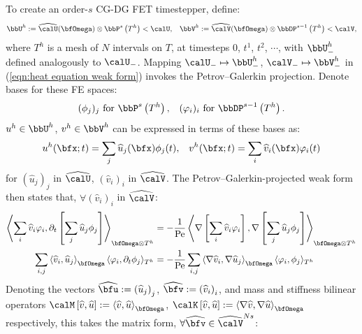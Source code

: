 \begin{example}
        To create an order-$s$ CG-DG FET timestepper, define:
        \begin{align}
            \bbU^{h}  :=  \widehat{\calU}(\bfOmega)\otimes\bbP^{s}\left(T^{h}\right)  <  \calU,  &&
            \bbV^{h}  :=  \widehat{\calV}(\bfOmega)\otimes\bbDP^{s - 1}\left(T^{h}\right)  <  \calV,
        \end{align}
        where $T^{h}$ is a mesh of $N$ intervals on $T$, at timesteps $0$, $t^{1}$, $t^{2}$, $\cdots$, with $\bbU^{h}_{-}$ defined analogously to $\calU_{-}$. Mapping $\calU_{-}  \mapsto  \bbU^{h}_{-}$, $\calV_{-}  \mapsto  \bbV^{h}_{-}$ in (\ref{eqn:heat equation weak form}) invokes the Petrov–Galerkin projection. Denote bases for these FE spaces:
        \begin{align}
            (\phi_{j})_{j}     \text{ for }  \bbP^{s}\left(T^{h}\right),         &&
            (\varphi_{i})_{i}  \text{ for }  \bbDP^{s - 1}\left(T^{h}\right).
        \end{align}
        $u^{h}  \in  \bbU^{h}$, $v^{h}  \in  \bbV^{h}$ can be expressed in terms of these bases as:
        \begin{align}
            u^{h}(\bfx; t)  =  \sum_{j}\widehat{u}_{j}(\bfx)\phi_{j}(t),  &&
            v^{h}(\bfx; t)  =  \sum_{i}\widehat{v}_{i}(\bfx)\varphi_{i}(t)
        \end{align}
        for $\left(\widehat{u}_{j}\right)_{j}$ in $\widehat{\calU}$, $\left(\widehat{v}_{i}\right)_{i}$ in $\widehat{\calV}$. The Petrov–Galerkin-projected weak form then states that, $\forall  \left(\widehat{v}_{i}\right)_{i}$ in $\widehat{\calV}$:
        \begin{align}
            \left\langle\sum_{i}\widehat{v}_{i}\varphi_{i}, \partial_{t}\left[\sum_{j}\widehat{u}_{j}\phi_{j}\right]\right\rangle_{\bfOmega\otimes T^{h}}  &=  - \frac{1}{\rmPe}\left\langle\nabla\left[\sum_{i}\widehat{v}_{i}\varphi_{i}\right], \nabla\left[\sum_{j}\widehat{u}_{j}\phi_{j}\right]\right\rangle_{\bfOmega\otimes T^{h}}  \\
            \sum_{i, j}\left\langle\widehat{v}_{i}, \widehat{u}_{j}\right\rangle_{\bfOmega}\langle\varphi_{i}, \partial_{t}\phi_{j}\rangle_{T^{h}}  &=  - \frac{1}{\rmPe}\sum_{i, j}\left\langle\nabla\widehat{v}_{i}, \nabla\widehat{u}_{j}\right\rangle_{\bfOmega}\langle\varphi_{i}, \phi_{j}\rangle_{T^{h}}
        \end{align}
        Denoting the vectors $\widehat{\bfu}  :=  \left(\widehat{u}_{j}\right)_{j}$, $\widehat{\bfv}  :=  \left(\widehat{v}_{i}\right)_{i}$, and mass and stiffness bilinear operators $\calM\left[\widehat{v}, \widehat{u}\right]  :=  \left\langle\widehat{v}, \widehat{u}\right\rangle_{\bfOmega}$, $\calK\left[\widehat{v}, \widehat{u}\right]  :=  \left\langle\nabla\widehat{v}, \nabla\widehat{u}\right\rangle_{\bfOmega}$ respectively, this takes the matrix form, $\forall  \widehat{\bfv}  \in  \widehat{\calV}^{Ns}$:

\end{example}
